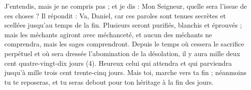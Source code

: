 \begin{multicols}{2}
J’entendis, mais je ne compris pas ; et je dis : Mon Seigneur, quelle sera l'issue de ces choses ?
Il répondit : Va, Daniel, car ces paroles sont tenues secrètes et scellées jusqu'au temps de la fin.
Plusieurs seront purifiés, blanchis et éprouvés ; mais les méchants agiront avec méchanceté, et aucun des méchants ne comprendra, mais les sages comprendront.
Depuis le temps où cessera le sacrifice perpétuel et où sera dressée l'abomination de la désolation, il y aura mille deux cent quatre-vingt-dix jours (4).
Heureux celui qui attendra et qui parviendra jusqu’à mille trois cent trente-cinq jours.
Mais toi, marche vers ta fin ; néanmoins tu te reposeras, et tu seras debout pour ton héritage à la fin des jours.
\PPE{}
\end{multicols}
